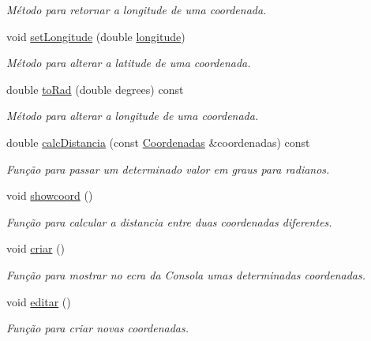 \begin{DoxyCompactItemize}
\begin{DoxyCompactList}\small\item\em Método para retornar a longitude de uma coordenada. \end{DoxyCompactList}\item 
void \hyperlink{class_coordenadas_af03ec9230d72b041265a9cbcf17a0369}{set\+Longitude} (double \hyperlink{class_coordenadas_a328c0d572b3a7d47bfbd866f5d6d6489}{longitude})
\begin{DoxyCompactList}\small\item\em Método para alterar a latitude de uma coordenada. \end{DoxyCompactList}\item 
double \hyperlink{class_coordenadas_a24cb37fe0c7b21e2cc1f4c4353119d4f}{to\+Rad} (double degrees) const 
\begin{DoxyCompactList}\small\item\em Método para alterar a longitude de uma coordenada. \end{DoxyCompactList}\item 
double \hyperlink{class_coordenadas_ab64cdc4dd54abd1eb0e8fa8b031c475f}{calc\+Distancia} (const \hyperlink{class_coordenadas}{Coordenadas} \&coordenadas) const 
\begin{DoxyCompactList}\small\item\em Função para passar um determinado valor em graus para radianos. \end{DoxyCompactList}\item 
void \hyperlink{class_coordenadas_ace2f5bfc3615c206d4f642f6714cf626}{showcoord} ()
\begin{DoxyCompactList}\small\item\em Função para calcular a distancia entre duas coordenadas diferentes. \end{DoxyCompactList}\item 
void \hyperlink{class_coordenadas_a9b1c73edfba7e5c4e0c6cae72174633c}{criar} ()
\begin{DoxyCompactList}\small\item\em Função para mostrar no ecra da Consola umas determinadas coordenadas. \end{DoxyCompactList}\item 
void \hyperlink{class_coordenadas_ad77fe69d9094889ae677bfa87459de3f}{editar} ()
\begin{DoxyCompactList}\small\item\em Função para criar novas coordenadas. \end{DoxyCompactList}\item 

\end{DoxyCompactItemize}

